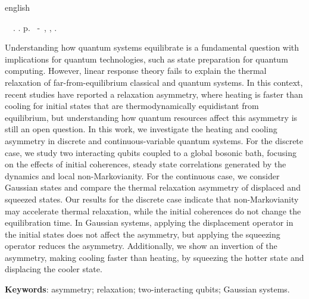\begin{resumo}[Abstract]
 \begin{otherlanguage*}{english}
	\begin{flushleft} 
		\setlength{\absparsep}{0pt} %
 		\SingleSpacing  		\imprimirautorabr~~\textbf{\imprimirtitleabstract}.	\imprimirdata.  \pageref{LastPage} p. 
		\imprimirtipotrabalhoabs~-~\imprimirinstituicao, \imprimirlocal, 	\imprimirdata. 
 	\end{flushleft}
	\OnehalfSpacing 

Understanding how quantum systems equilibrate is a fundamental question with implications for quantum technologies, such as state preparation for quantum computing. However, linear response theory fails to explain the thermal relaxation of far-from-equilibrium classical and quantum systems. In this context, recent studies have reported a relaxation asymmetry, where heating is faster than cooling for initial states that are thermodynamically equidistant from equilibrium, but understanding how quantum resources affect this asymmetry is still an open question. In this work, we investigate the heating and cooling asymmetry in discrete and continuous-variable quantum systems. For the discrete case, we study two interacting qubits coupled to a global bosonic bath, focusing on the effects of initial coherences, steady state correlations generated by the dynamics and local non-Markovianity. For the continuous case, we consider Gaussian states and compare the thermal relaxation asymmetry of displaced and squeezed states. Our results for the discrete case indicate that non-Markovianity may accelerate thermal relaxation, while the initial coherences do not change the equilibration time. In Gaussian systems, applying the displacement operator in the initial states does not affect the asymmetry, but applying the squeezing operator reduces the asymmetry. Additionally, we show an invertion of the asymmetry, making cooling faster than heating, by squeezing the hotter state and displacing the cooler state.

   \vspace{\onelineskip}
 
   \noindent 
   \textbf{Keywords}: asymmetry; relaxation; two-interacting qubits; Gaussian systems.
 \end{otherlanguage*}
\end{resumo}
